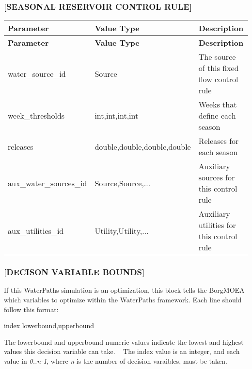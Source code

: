 \subsubsection*{\mbox{[}S\+E\+A\+S\+O\+N\+AL R\+E\+S\+E\+R\+V\+O\+IR C\+O\+N\+T\+R\+OL R\+U\+LE\mbox{]}}

\tabulinesep=1mm
\begin{longtabu} spread 0pt [c]{*{3}{|X[-1]}|}
\hline
\rowcolor{\tableheadbgcolor}\textbf{ Parameter  }&\textbf{ Value Type  }&\textbf{ Description   }\\
\endfirsthead
\hline
\endfoot
\hline
\rowcolor{\tableheadbgcolor}\textbf{ Parameter  }&\textbf{ Value Type  }&\textbf{ Description   }\\
\endhead
water\+\_\+source\+\_\+id  &Source  &The source of this fixed flow control rule   \\
week\+\_\+thresholds  &int,int,int,int  &Weeks that define each season   \\
releases  &double,double,double,double  &Releases for each season   \\
aux\+\_\+water\+\_\+sources\+\_\+id  &Source,Source,...  &Auxiliary sources for this control rule   \\
aux\+\_\+utilities\+\_\+id  &Utility,Utility,...  &Auxiliary utilities for this control rule   \\
\end{longtabu}


\subsubsection*{\mbox{[}D\+E\+C\+I\+S\+ON V\+A\+R\+I\+A\+B\+LE B\+O\+U\+N\+DS\mbox{]}}

If this Water\+Paths simulation is an optimization, this block tells the Borg\+M\+O\+EA which variables to optimize within the Water\+Paths framework. Each line should follow this format\+: 
\begin{DoxyCode}
index lowerbound,upperbound
\end{DoxyCode}
 The {\ttfamily lowerbound} and {\ttfamily upperbound} numeric values indicate the lowest and highest values this decision variable can take. ~\newline
 The {\ttfamily index} value is an integer, and each value in {\itshape 0..n-\/1}, where {\itshape n} is the number of decision varaibles, must be taken. ~\newline



